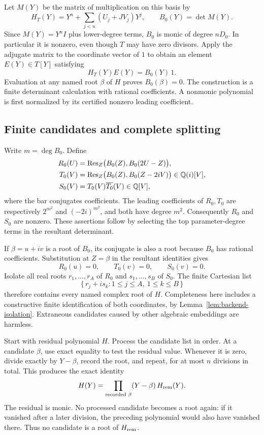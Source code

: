 Let $M(Y)$ be the matrix of multiplication on this basis by
\[
 H_T(Y)=Y^n+\sum_{j<n}(U_j+JV_j)Y^j,
 \qquad B_0(Y)=\det M(Y).
\]
Since $M(Y)=Y^nI$ plus lower-degree terms, $B_0$ is monic of degree $nD_0$.
In particular it is nonzero, even though $T$ may have zero divisors.
Apply the adjugate matrix to the coordinate vector of $1$ to obtain an
element $E(Y)\in T[Y]$ satisfying
\[
 H_T(Y)E(Y)=B_0(Y)\,1.
\]
Evaluation at any named root $\beta$ of $H$ proves $B_0(\beta)=0$.
The construction is a finite determinant calculation with rational
coefficients. A nonmonic polynomial is first normalized by its certified
nonzero leading coefficient.

\subsection{Finite candidates and complete splitting}

Write $m=\deg B_0$. Define
\begin{align*}
 R_0(U)&=\operatorname{Res}_Z\bigl(B_0(Z),B_0(2U-Z)\bigr),\\
 T_0(V)&=\operatorname{Res}_Z\bigl(B_0(Z),B_0(Z-2iV)\bigr)\in\mathbb Q(i)[V],\\
 S_0(V)&=T_0(V)\overline{T_0}(V)\in\mathbb Q[V],
\end{align*}
where the bar conjugates coefficients.
The leading coefficients of $R_0,T_0$ are respectively
$2^{m^2}$ and $(-2i)^{m^2}$, and both have degree $m^2$.
Consequently $R_0$ and $S_0$ are nonzero.
These assertions follow by selecting the top parameter-degree terms in
the resultant determinant.

If $\beta=u+iv$ is a root of $B_0$, its conjugate is also a root because
$B_0$ has rational coefficients. Substitution at $Z=\beta$ in the
resultant identities gives
\[
 R_0(u)=0,\qquad T_0(v)=0,\qquad S_0(v)=0.
\]
Isolate all real roots $r_1,\ldots,r_A$ of $R_0$ and
$s_1,\ldots,s_B$ of $S_0$. The finite Cartesian list
\[
 \{\,r_j+i s_k:1\le j\le A,\ 1\le k\le B\,\}
\]
therefore contains every named complex root of $H$.
Completeness here includes a constructive finite identification of both
coordinates, by Lemma~\ref{lem:backend-isolation}.
Extraneous candidates caused by other algebraic embeddings are harmless.

Start with residual polynomial $H$. Process the candidate list in order.
At a candidate $\beta$, use exact equality to test the residual value.
Whenever it is zero, divide exactly by $Y-\beta$, record the root,
and repeat, for at most $n$ divisions in total.
This produces the exact identity
\[
 H(Y)=\prod_{\text{recorded }\beta}(Y-\beta)\,H_{\rm rem}(Y).
\]
The residual is monic. No processed candidate becomes a root again:
if it vanished after a later division, the preceding polynomial would
also have vanished there. Thus no candidate is a root of $H_{\rm rem}$.

